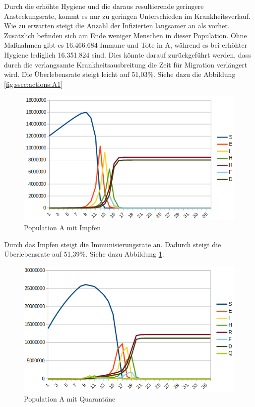 Durch die erhöhte Hygiene und die daraus resultierende geringere Ansteckungsrate, kommt es nur zu geringen Unterschieden im Krankheitsverlauf. Wie zu erwarten steigt die Anzahl der Infizierten langsamer an als vorher. Zusätzlich befinden sich am Ende weniger Menschen in dieser Population. Ohne Maßnahmen gibt es 16.466.684 Immune und Tote in A, während es bei erhöhter Hygiene lediglich 16.351.824 sind. Dies könnte darauf zurückgeführt werden, dass durch die verlangsamte Krankheitsausbreitung die Zeit für Migration verlängert wird. Die Überlebensrate steigt leicht auf 51,03\%. Siehe dazu die Abbildung \ref{fig:ssec:actions:A1}\\
 \begin{figure}
 \includegraphics[width=1\textwidth]{massnahmen/A2}
\caption{Population A mit Impfen}
\label{fig:ssec:actions:A2}
\end{figure}
  Durch das Impfen steigt die Immunisierungsrate an. Dadurch steigt die Überlebensrate auf 51,39\%. Siehe dazu Abbildung \ref{fig:ssec:actions:A2}.\\
  \begin{figure}
 \includegraphics[width=1\textwidth]{massnahmen/A3}
\caption{Population A mit Quarantäne}
\label{fig:ssec:actions:A3}
\end{figure}
